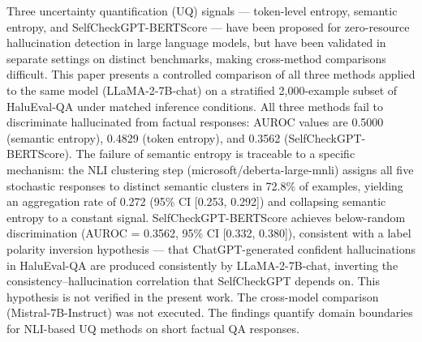 
Three uncertainty quantification (UQ) signals — token-level entropy, semantic entropy, and SelfCheckGPT-BERTScore — have been proposed for zero-resource hallucination detection in large language models, but have been validated in separate settings on distinct benchmarks, making cross-method comparisons difficult. This paper presents a controlled comparison of all three methods applied to the same model (LLaMA-2-7B-chat) on a stratified 2,000-example subset of HaluEval-QA under matched inference conditions. All three methods fail to discriminate hallucinated from factual responses: AUROC values are 0.5000 (semantic entropy), 0.4829 (token entropy), and 0.3562 (SelfCheckGPT-BERTScore). The failure of semantic entropy is traceable to a specific mechanism: the NLI clustering step (microsoft/deberta-large-mnli) assigns all five stochastic responses to distinct semantic clusters in 72.8\% of examples, yielding an aggregation rate of 0.272 (95\% CI [0.253, 0.292]) and collapsing semantic entropy to a constant signal. SelfCheckGPT-BERTScore achieves below-random discrimination (AUROC = 0.3562, 95\% CI [0.332, 0.380]), consistent with a label polarity inversion hypothesis — that ChatGPT-generated confident hallucinations in HaluEval-QA are produced consistently by LLaMA-2-7B-chat, inverting the consistency–hallucination correlation that SelfCheckGPT depends on. This hypothesis is not verified in the present work. The cross-model comparison (Mistral-7B-Instruct) was not executed. The findings quantify domain boundaries for NLI-based UQ methods on short factual QA responses.

